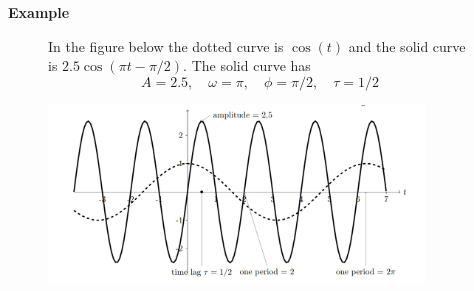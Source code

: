 \documentclass{report}
\begin{document}
\newpage
\noindent\textbf{Example}\\
\begin{figure}[h]
In the figure below the dotted curve is $\cos(t)$ and the solid curve is $2.5\cos(\pi t-\pi/2)$. The solid
curve has
\begin{equation*}
A=2.5,\quad\omega=\pi,\quad\phi=\pi/2,\quad\tau=1/2
\end{equation*}
\begin{center}
\includegraphics[width=10cm]{10}\\
\end{center}
\end{figure}
\newpage
\end{document}
